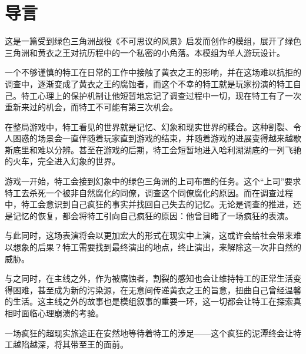 \section{导言}

这是一篇受到绿色三角洲战役《不可思议的风景》启发而创作的模组，展开了绿色三角洲和黄衣之王对抗历程中的一个私密的小角落。本模组为单人游玩设计。

一个不够谨慎的特工在日常的工作中接触了黄衣之王的影响，并在这场难以抗拒的调查中，逐渐变成了黄衣之王的腐蚀者，而这个不幸的特工就是玩家扮演的特工自己。特工心理上的保护机制让他短暂地忘记了调查过程中一切，现在特工有了一次重新来过的机会，而特工不可能有第三次机会。

在整局游戏中，特工看见的世界就是记忆、幻象和现实世界的糅合。这种割裂、令人困惑的场景会一直伴随着玩家直到游戏的结束，并随着游戏的进展变得越来越歇斯底里和难以分辨。甚至在游戏的后期，特工会短暂地进入哈利湖湖底的一列飞驰的火车，完全进入幻象的世界。

游戏一开始，特工会接到幻象中的绿色三角洲的上司布置的任务。这个“上司”要求特工去杀死一个被非自然腐化的同僚，调查这个同僚腐化的原因。而在调查过程中，特工会意识到自己疯狂的事实并找回自己失去的记忆。无论是调查的推进，还是记忆的恢复，都会将特工引向自己疯狂的原因：他曾目睹了一场疯狂的表演。

与此同时，这场表演将会以更加宏大的形式在现实中上演，这或许会给社会带来难以想象的后果？特工需要找到最终演出的地点，终止演出，来解除这一次非自然的威胁。

与之同时，在主线之外，作为被腐蚀者，割裂的感知也会让维持特工的正常生活变得困难，甚至成为新的污染源，在无意间传递黄衣之王的旨意，扭曲自己曾经温馨的生活。这主线之外的故事也是模组叙事的重要一环，这一切都会让特工在探索真相时面临心理崩溃的考验。

一场疯狂的超现实旅途正在安然地等待着特工的涉足——这个疯狂的泥潭终会让特工越陷越深，将其带至王的面前。